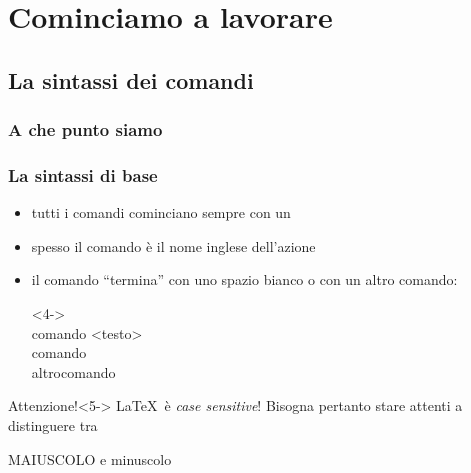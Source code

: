 \documentclass[svgnames,%
	ucs,%
	pdftex]{guitbeamer}
\begin{document}
\section{Cominciamo a lavorare}
\subsection{La sintassi dei comandi}
\begin{frame}
  \frametitle{A che punto siamo}
\end{frame}
\begin{frame}
  \frametitle{La sintassi di base}
	\begin{itemize}[<+->]
	\item tutti i comandi cominciano sempre con un
		\LCmd\
	\item spesso il comando \`e il nome inglese dell'azione
	\item il comando ``termina'' con uno spazio bianco o con un
		altro comando:
	\begin{LaTeXcode}<4->
		\\comando \alert{<testo>}\n
		\\comando\\altrocomando
	\end{LaTeXcode}
	\end{itemize}
  \smallskip
	\begin{block}{Attenzione!}<5->
		\LaTeX\ \`e \textit{case sensitive}! Bisogna pertanto stare attenti a distinguere tra\\[.2em]
		\begin{center}
			\alert{\large MAIUSCOLO} e \alert{\large minuscolo}
		\end{center}
	\end{block}
\end{frame}
\end{document}
